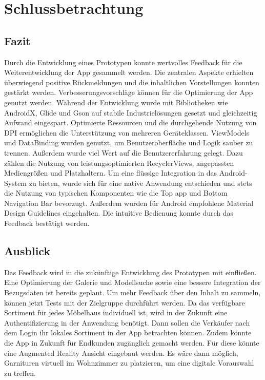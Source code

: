 \section{Schlussbetrachtung}

\subsection{Fazit}

Durch die Entwicklung eines Prototypen konnte wertvolles Feedback für die Weiterentwicklung der App gesammelt werden. Die zentralen Aspekte erhielten überwiegend positive Rückmeldungen und die inhaltlichen Vorstellungen konnten gestärkt werden. Verbesserungsvorschläge können für die Optimierung der App genutzt werden. Während der Entwicklung wurde mit Bibliotheken wie AndroidX, Glide und Gson auf stabile Industrielösungen gesetzt und gleichzeitig Aufwand eingespart. Optimierte Ressourcen und die durchgehende Nutzung von \gls{DPI} ermöglichen die Unterstützung von mehreren Geräteklassen. ViewModels und DataBinding wurden genutzt, um Benutzeroberfläche und Logik sauber zu trennen. Außerdem wurde viel Wert auf die Benutzererfahrung gelegt. Dazu zählen die Nutzung von leistungsoptimierten RecyclerViews, angepassten Mediengrößen und Platzhaltern. Um eine flüssige Integration in das Android-System zu bieten, wurde sich für eine native Anwendung entschieden und stets die Nutzung von typischen Komponenten wie die Top app und Bottom Navigation Bar bevorzugt. Außerdem wurden für Android empfohlene Material Design Guidelines eingehalten. Die intuitive Bedienung konnte durch das Feedback bestätigt werden.

\subsection{Ausblick}



Das Feedback wird in die zukünftige Entwicklung des Prototypen mit einfließen. Eine Optimierung der Galerie und Modellsuche sowie eine bessere Integration der Bezugsdaten ist bereits geplant. Um mehr Feedback über den Inhalt zu sammeln, können jetzt Tests mit der Zielgruppe durchführt werden. Da das verfügbare Sortiment für jedes Möbelhaus individuell ist, wird in der Zukunft eine Authentifizierung in der Anwendung benötigt. Dann sollen die Verkäufer nach dem Login ihr lokales Sortiment in der App betrachten können. Zudem könnte die App in Zukunft für Endkunden zugänglich gemacht werden. Für diese könnte eine Augmented Reality Ansicht eingebaut werden. Es wäre dann möglich, Garnituren virtuell im Wohnzimmer zu platzieren, um eine digitale Vorauswahl zu treffen.

\clearpage